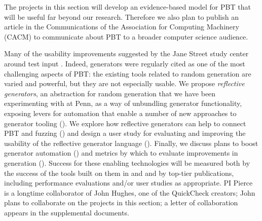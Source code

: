 
\smallskip The projects in this section will develop an evidence-based model for
PBT that will be useful far beyond our research. Therefore we also plan to
publish an article in the Communications of the Association for Computing
Machinery (CACM) to communicate about PBT to a broader computer science audience.

Many of the usability improvements suggested by the Jane Street study center
around test input
.
Indeed, generators were regularly cited as one of the most challenging
aspects of PBT: the existing tools related to random generation are varied
and powerful, but
they are not especially usable.  We propose {\em reflective
generators}, an abstraction for random generation that we have been
experimenting with at Penn, as a way of unbundling generator
functionality, exposing levers for
automation that enable a number of new approaches to generator
tooling (). We explore how reflective generators can
help to connect PBT and fuzzing () and design
a user study for evaluating and improving the usability of the reflective
generator language (). Finally, we discuss
plans to boost generator automation () and metrics
by which to evaluate improvements in generation ().
Success for these enabling technologies will be measured both by the success of
the tools built on them in  and 
and by top-tier publications, including performance evaluations and/or
user studies as appropriate.
PI Pierce is a longtime collaborator of John Hughes, one of the
QuickCheck creators; John plans to collaborate on the projects
in this section; a letter of collaboration appears in the supplemental
documents.

